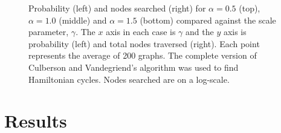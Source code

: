 \documentclass[twoside,11pt]{article}
\begin{document}
\begin{figure}
\caption{Probability (left) and nodes searched (right) for $\alpha=0.5$ (top), $\alpha = 1.0$ (middle) and $\alpha = 1.5$ (bottom) compared against the scale parameter, $\gamma$.  The $x$ axis in each case is $\gamma$ and the $y$ axis is probability (left) and total nodes traversed (right).  Each point represents the average of 200 graphs.
The complete version of Culberson and Vandegriend's algorithm
was used to find Hamiltonian cycles.
Nodes searched are on a log-scale.  }
\label{complete_a0.5}
\label{complete_a1.0}

\label{complete_a1.5}
\end{figure}

\section{Results}
\label{sec:Results}
\end{document}
